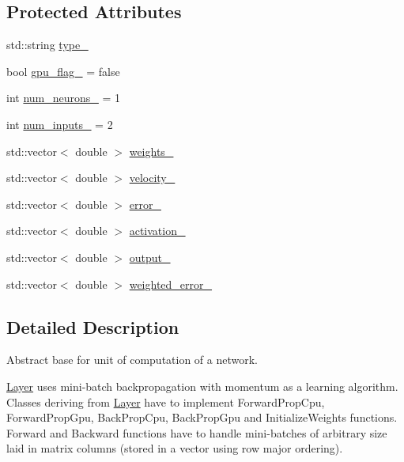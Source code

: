 \subsection*{Protected Attributes}
\begin{DoxyCompactItemize}
\item 
std\+::string \hyperlink{classneuralnet_1_1Layer_a17192e2a166d6c93eab9e5cb1ae3ca8b}{type\+\_\+}
\item 
bool \hyperlink{classneuralnet_1_1Layer_aee4be6e70fb225f18923065940330a26}{gpu\+\_\+flag\+\_\+} = false
\item 
int \hyperlink{classneuralnet_1_1Layer_a68e1d25866b4dcc67cb2077d66903927}{num\+\_\+neurons\+\_\+} = 1
\item 
int \hyperlink{classneuralnet_1_1Layer_a847df7ad431ecab992715e074f4ee727}{num\+\_\+inputs\+\_\+} = 2
\item 
std\+::vector$<$ double $>$ \hyperlink{classneuralnet_1_1Layer_a6d62e504bac81323fb080a06b2f99341}{weights\+\_\+}
\item 
std\+::vector$<$ double $>$ \hyperlink{classneuralnet_1_1Layer_a4c4ae4520ce043abcb2d0b47720f37dc}{velocity\+\_\+}
\item 
std\+::vector$<$ double $>$ \hyperlink{classneuralnet_1_1Layer_a02c84d95e6a9e70e57b4f2b5d5e18ab9}{error\+\_\+}
\item 
std\+::vector$<$ double $>$ \hyperlink{classneuralnet_1_1Layer_a848eea2f5878b342484830b311fe0e08}{activation\+\_\+}
\item 
std\+::vector$<$ double $>$ \hyperlink{classneuralnet_1_1Layer_ac5cf4575860e583d5e6ff09841fa79ed}{output\+\_\+}
\item 
std\+::vector$<$ double $>$ \hyperlink{classneuralnet_1_1Layer_a0baf6630ce4d07bd22815eedec391a72}{weighted\+\_\+error\+\_\+}
\end{DoxyCompactItemize}


\subsection{Detailed Description}
Abstract base for unit of computation of a network. 

\hyperlink{classneuralnet_1_1Layer}{Layer} uses mini-\/batch backpropagation with momentum as a learning algorithm. Classes deriving from \hyperlink{classneuralnet_1_1Layer}{Layer} have to implement Forward\+Prop\+Cpu, Forward\+Prop\+Gpu, Back\+Prop\+Cpu, Back\+Prop\+Gpu and Initialize\+Weights functions. Forward and Backward functions have to handle mini-\/batches of arbitrary size laid in matrix columns (stored in a vector using row major ordering). 

